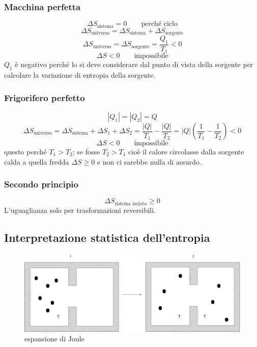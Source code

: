 \subsubsection{Macchina perfetta}

\[\Delta S_\text{sistema}=0 \qquad\text{perché ciclo}\]
\[\Delta S_\text{universo}=\Delta S_\text{sistema}+\Delta S_\text{sorgente}\]
\[\Delta S_\text{universo}=\Delta S_\text{sorgente}=\frac{Q_1}{T_1}<0\]
\[\Delta S<0\qquad \text{impossibile}\]
$Q_1$ è negativo perché lo si deve considerare dal punto di vista della sorgente per calcolare la variazione di entropia della sorgente.

\subsubsection{Frigorifero perfetto}


\[|Q_1|=|Q_2|=Q\]
\[\Delta S_\text{universo}=\Delta S_\text{sistema}+\Delta S_1+\Delta S_2=\frac{|Q|}{T_1}-\frac{|Q|}{T_2}=|Q|\left(\frac{1}{T_1}-\frac{1}{T_2}\right)<0\]
\[\Delta S<0\qquad \text{impossibile}\]
questo perché $T_1>T_2$; se fosse $T_2>T_1$ cioè il calore circolasse dalla sorgente calda a quella fredda $\Delta S\geq 0$ e non ci sarebbe nulla di assurdo.

\subsubsection{Secondo principio}
\[\Delta S_\text{sistema isolato}\geq 0\]
L'uguaglianza solo per trasformazioni reversibili.


\subsection{Interpretazione statistica dell'entropia}
\begin{figure}[htbp]
\centering
\includegraphics[scale=0.45]{immagini/fisica1/exp_Joule}
\caption{espansione di Joule}
\end{figure}

